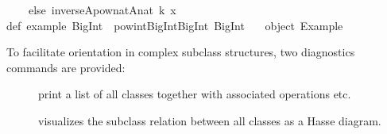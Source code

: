 \begin{isabellebody}
\begin{isamarkuptext}
\ \ \ \ else\ inverse{}A{}{}pow{}nat{}A{}{}nat{}{}{}\ k{}{}{}\ x{}{}{}\isanewline
\isanewline
def\ example{}\ BigInt\ {}\ pow{}int{}BigInt{}{}BigInt{}{}{}{}{}\ BigInt{}{}\ {}{}{}\isanewline
\isanewline
{}\ {}{}\ object\ Example\ {}{}\isanewline%
\end{isamarkuptext}%
\isamarkuptrue%
%
\endisatagquotetypewriter
{\isafoldquotetypewriter}%
%
\isadelimquotetypewriter
%
\endisadelimquotetypewriter
%
\isamarkuptrue%
%
\begin{isamarkuptext}%
To facilitate orientation in complex subclass structures, two
  diagnostics commands are provided:

  \begin{description}

    \item[\hyperlink{command.print-classes}{\mbox{}}] print a list of all classes
      together with associated operations etc.

    \item[\hyperlink{command.class-deps}{\mbox{}}] visualizes the subclass relation
      between all classes as a Hasse diagram.

  \end{description}%
\end{isamarkuptext}%
\isamarkuptrue%
%
\isadelimtheory
%
\endisadelimtheory
%
\isatagtheory
{}\isamarkupfalse%
%
\endisatagtheory
{\isafoldtheory}%
%
\isadelimtheory
%
\endisadelimtheory
\isanewline
\end{isabellebody}%
